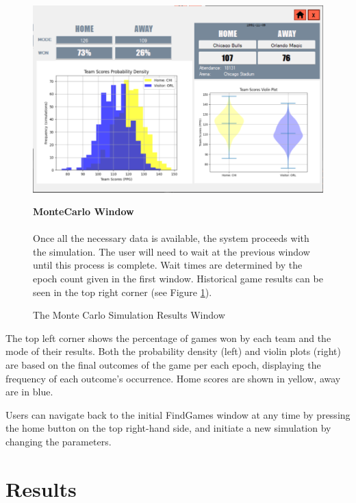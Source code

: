 \documentclass{thesis-ekf}
\theoremstyle{definition}
\theoremstyle{remark}
\begin{document}
\begin{figure}[H]
	\begin{minipage}{0.69\textwidth}
		\centering
		\includegraphics[width=\textwidth]{img/user-guide/MonteCarlo}
		\caption{The Monte Carlo Simulation Results Window}
		\label{img-montecarlo}
	\end{minipage}
	\hfill
	\begin{minipage}{0.28\textwidth}
		\textbf{MonteCarlo Window} \\ \\
		Once all the necessary data is available, the system proceeds with the simulation. The user will need to wait at the previous window until this process is complete. Wait times are determined by the epoch count given in the first window. 
		Historical game results can be seen in the top right corner (see Figure \ref{img-montecarlo}). 
	\end{minipage}
\end{figure}


The top left corner shows the percentage of games won by each team and the mode of their results. Both the probability density (left) and violin plots (right) are based on the final outcomes of the game per each epoch, displaying the frequency of each outcome's occurrence. Home scores are shown in yellow, away are in blue.

Users can navigate back to the initial FindGames window at any time by pressing the home button on the top right-hand side, and initiate a new simulation by changing the parameters.


\chapter{Results}
\end{document}

